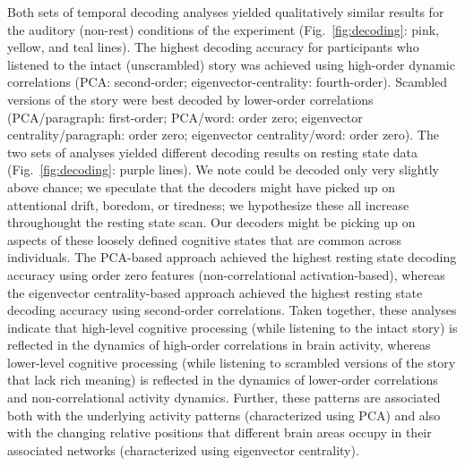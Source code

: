 \documentclass[english]{article}
\begin{document}
Both sets of temporal decoding analyses yielded qualitatively similar
results for the auditory (non-rest) conditions of the experiment
(Fig.~\ref{fig:decoding}: pink, yellow, and teal lines).  The highest
decoding accuracy for participants who listened to the intact
(unscrambled) story was achieved using high-order dynamic correlations
(PCA: second-order; eigenvector-centrality: fourth-order).  Scambled
versions of the story were best decoded by lower-order correlations
(PCA/paragraph: first-order; PCA/word: order zero; eigenvector
centrality/paragraph: order zero; eigenvector centrality/word: order
zero).  The two sets of analyses yielded different decoding results on
resting state data (Fig.~\ref{fig:decoding}: purple lines).  We note
could be decoded only very slightly above chance; we speculate that
the decoders might have picked up on attentional drift, boredom, or
tiredness; we hypothesize these all increase throughought the resting
state scan.  Our decoders might be picking up on aspects of these
loosely defined cognitive states that are common across individuals.
The PCA-based approach achieved the highest resting state decoding
accuracy using order zero features (non-correlational
activation-based), whereas the eigenvector centrality-based approach
achieved the highest resting state decoding accuracy using
second-order correlations.  Taken together, these analyses indicate
that high-level cognitive processing (while listening to the intact
story) is reflected in the dynamics of high-order correlations in
brain activity, whereas lower-level cognitive processing (while
listening to scrambled versions of the story that lack rich meaning)
is reflected in the dynamics of lower-order correlations and
non-correlational activity dynamics.  Further, these patterns are
associated both with the underlying activity patterns (characterized
using PCA) and also with the changing relative positions that
different brain areas occupy in their associated networks
(characterized using eigenvector centrality).
\end{document}

